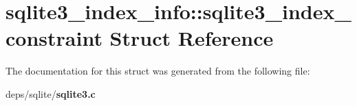 \section{sqlite3\_\-index\_\-info::sqlite3\_\-index\_\-constraint Struct Reference}
\label{structsqlite3__index__info_1_1sqlite3__index__constraint}


The documentation for this struct was generated from the following file:\begin{CompactItemize}
\item 
deps/sqlite/\bf{sqlite3.c}\end{CompactItemize}
